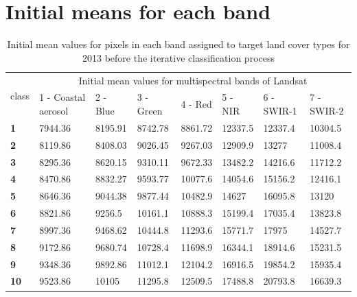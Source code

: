 \documentclass[jmse,article,submit,pdftex,moreauthors]{Definitions/mdpi}
\begin{document}
\section[\appendixname~\thesection]{Initial means for each band}\label{AppA}

\begin{table}[H]
  \centering
  \begin{tabularx}{\textwidth}{p{0.7cm}p{2.5cm}p{1.0cm}p{1.3cm}p{1.0cm}p{1.0cm}p{1.5cm}p{1.5cm}}
  \toprule
  \multirow{2}{*}{class} & \multicolumn{7}{c}{Initial mean values for multispectral bands of Landsat} \\
     & 1 - Coastal aerosol & 2 - Blue & 3 - Green & 4 - Red & 5 - NIR & 6 - SWIR-1 & 7 - SWIR-2 \\
    \midrule
    \textbf{1} & 7944.36 & 8195.91 & 8742.78 & 8861.72 & 12337.5 & 12337.4 & 10304.5 \\
    \textbf{2} & 8119.86 & 8408.03 & 9026.45 & 9267.03 & 12909.9 & 13277 & 11008.4 \\
    \textbf{3} & 8295.36 & 8620.15 & 9310.11 & 9672.33 & 13482.2 & 14216.6 & 11712.2 \\
    \textbf{4} & 8470.86 & 8832.27 & 9593.77 & 10077.6 & 14054.6 & 15156.2 & 12416.1 \\
    \textbf{5} & 8646.36 & 9044.38 & 9877.44 & 10482.9 & 14627 & 16095.8 & 13120 \\
    \textbf{6} & 8821.86 & 9256.5 & 10161.1 & 10888.3 & 15199.4 &17035.4 & 13823.8  \\
    \textbf{7} & 8997.36 & 9468.62 & 10444.8 & 11293.6 & 15771.7 & 17975 & 14527.7 \\
    \textbf{8} & 9172.86 & 9680.74 & 10728.4 & 11698.9 & 16344.1 & 18914.6 & 15231.5 \\
    \textbf{9} & 9348.36 & 9892.86 & 11012.1 & 12104.2 & 16916.5 & 19854.2 & 15935.4 \\
    \textbf{10} & 9523.86 & 10105 & 11295.8 & 12509.5 & 17488.8 & 20793.8 & 16639.3 \\
\bottomrule
\end{tabularx}
  \caption{Initial mean values for pixels in each band assigned to target land cover types for 2013 before the iterative classification process}
  \label{tabA1} 
\end{table} 
\end{document}
